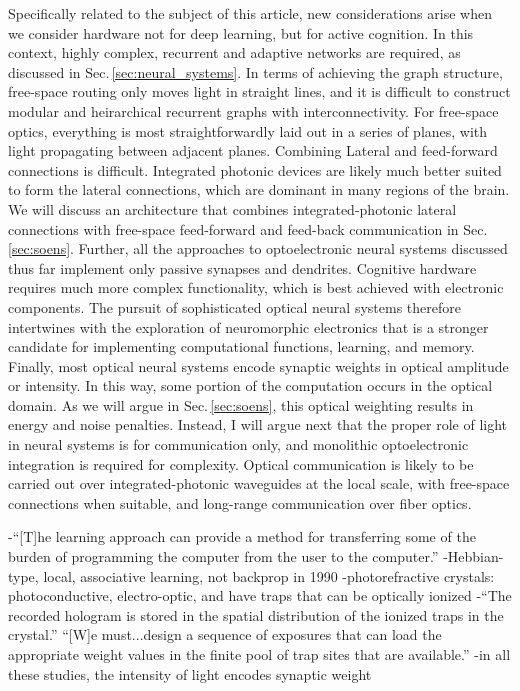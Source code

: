 Specifically related to the subject of this article, new considerations arise when we consider hardware not for deep learning, but for active cognition. In this context, highly complex, recurrent and adaptive networks are required, as discussed in Sec.\,\ref{sec:neural_systems}. In terms of achieving the graph structure, free-space routing only moves light in straight lines, and it is difficult to construct modular and heirarchical recurrent graphs with interconnectivity. For free-space optics, everything is most straightforwardly laid out in a series of planes, with light propagating between adjacent planes. Combining Lateral and feed-forward connections is difficult. Integrated photonic devices are likely much better suited to form the lateral connections, which are dominant in many regions of the brain. We will discuss an architecture that combines integrated-photonic lateral connections with free-space feed-forward and feed-back communication in Sec.\,\ref{sec:soens}. Further, all the approaches to optoelectronic neural systems discussed thus far implement only passive synapses and dendrites. Cognitive hardware requires much more complex functionality, which is best achieved with electronic components. The pursuit of sophisticated optical neural systems therefore intertwines with the exploration of neuromorphic electronics that is a stronger candidate for implementing computational functions, learning, and memory. Finally, most optical neural systems encode synaptic weights in optical amplitude or intensity. In this way, some portion of the computation occurs in the optical domain. As we will argue in Sec.\,\ref{sec:soens}, this optical weighting results in energy and noise penalties. Instead, I will argue next that the proper role of light in neural systems is for communication only, and monolithic optoelectronic integration is required for complexity. Optical communication is likely to be carried out over integrated-photonic waveguides at the local scale, with free-space connections when suitable, and long-range communication over fiber optics.




-``[T]he learning approach can provide a method for transferring some of the burden of programming the computer from the user to the computer.''
-Hebbian-type, local, associative learning, not backprop in 1990
-photorefractive crystals: photoconductive, electro-optic, and have traps that can be optically ionized
-``The recorded hologram is stored in the spatial distribution of the ionized traps in the crystal.'' ``[W]e must...design a sequence of exposures that can load the appropriate weight values in the finite pool of trap sites that are available.''
-in all these studies, the intensity of light encodes synaptic weight

